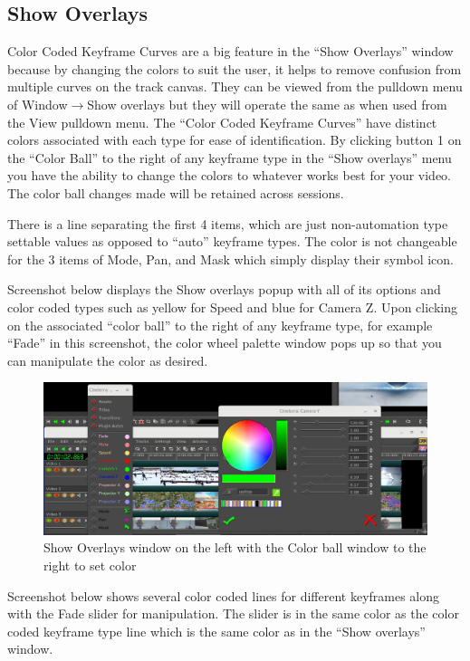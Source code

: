 \subsection{Show Overlays}%
\label{sub:show_overlays}

Color Coded Keyframe Curves are a big feature in the “Show Overlays” window because by changing the colors to suit the user, it helps to remove confusion from multiple curves on the track canvas.  
They can be viewed from the pulldown menu of Window$\rightarrow$Show overlays but they will operate the same as when used from the View pulldown menu.  
The “Color Coded Keyframe Curves” have distinct colors associated with each type for ease of identification.  
By clicking button 1 on the “Color Ball” to the right of any keyframe type in the “Show overlays” menu you have the ability to change the colors to whatever works best for your video.  
The color ball changes made will be retained across sessions.

There is a line separating the first 4 items, which are just non-automation type settable values as opposed to “auto” keyframe types.  
The color is not changeable for the 3 items of Mode, Pan, and Mask which simply display their symbol icon.

Screenshot below displays the Show overlays popup with all of its options and color coded types such as yellow for Speed and blue for Camera Z.  
Upon clicking on the associated “color ball” to the right of any keyframe type, for example “Fade” in this screenshot, the color wheel palette window pops up so that you can manipulate the color as desired.

\begin{figure}[htpb]
    \centering
    \includegraphics[width=0.99\linewidth]{images/overlays_window.png}
    \caption{Show Overlays window on the left with the Color ball window to the right to set color}
    \label{fig:overlays_window}
\end{figure}

Screenshot below shows several color coded lines for different keyframes along with the Fade slider for manipulation.  
The slider is in the same color as the color coded keyframe type line which is the same color as in the “Show overlays” window.

